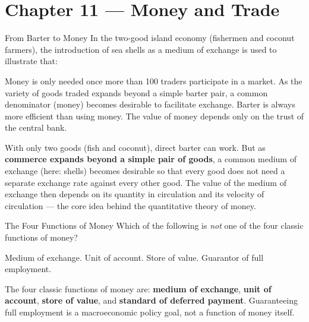 \section{Chapter 11 — Money and Trade}

\begin{question}[type=mc]{From Barter to Money}
In the two-good island economy (fishermen and coconut farmers), the
introduction of sea shells as a medium of exchange is used to illustrate
that:
\begin{choices}
  \choice        Money is only needed once more than 100 traders participate
                 in a market.
  \correctchoice As the variety of goods traded expands beyond a simple
                 barter pair, a common denominator (money) becomes desirable
                 to facilitate exchange.
  \choice        Barter is always more efficient than using money.
  \choice        The value of money depends only on the trust of the central
                 bank.
\end{choices}
\begin{solution}
  With only two goods (fish and coconut), direct barter can work. But as
  \textbf{commerce expands beyond a simple pair of goods}, a common medium
  of exchange (here: shells) becomes desirable so that every good does not
  need a separate exchange rate against every other good. The value of the
  medium of exchange then depends on its quantity in circulation and its
  velocity of circulation — the core idea behind the quantitative theory of
  money.
\end{solution}
\end{question}

\begin{question}[type=mc]{The Four Functions of Money}
Which of the following is \emph{not} one of the four classic functions of
money?
\begin{choices}
  \choice        Medium of exchange.
  \choice        Unit of account.
  \choice        Store of value.
  \correctchoice Guarantor of full employment.
\end{choices}
\begin{solution}
  The four classic functions of money are: \textbf{medium of exchange},
  \textbf{unit of account}, \textbf{store of value}, and \textbf{standard of
  deferred payment}. Guaranteeing full employment is a macroeconomic policy
  goal, not a function of money itself.
\end{solution}
\end{question}


